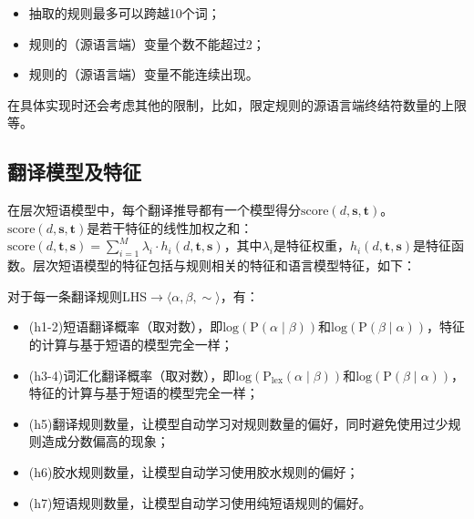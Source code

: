 \begin{itemize}
\vspace{0.5em}
\item 抽取的规则最多可以跨越10个词；
\vspace{0.5em}
\item 规则的（源语言端）变量个数不能超过2；
\vspace{0.5em}
\item 规则的（源语言端）变量不能连续出现。
\vspace{0.5em}
\end{itemize}
\parinterval 在具体实现时还会考虑其他的限制，比如，限定规则的源语言端终结符数量的上限等。


\subsection{翻译模型及特征}

\parinterval 在层次短语模型中，每个翻译推导都有一个模型得分$\textrm{score}(d,\mathbf{s},\mathbf{t})$。$\textrm{score}(d,\mathbf{s},\mathbf{t})$是若干特征的线性加权之和：$\textrm{score}(d,\mathbf{t},\mathbf{s})=\sum_{i=1}^M\lambda_i\cdot h_i (d,\mathbf{t},\mathbf{s})$，其中$\lambda_i$是特征权重，$h_i (d,\mathbf{t},\mathbf{s})$是特征函数。层次短语模型的特征包括与规则相关的特征和语言模型特征，如下：

\parinterval 对于每一条翻译规则LHS$\to \langle \alpha, \beta ,\sim \rangle$，有：

\begin{itemize}
\vspace{0.5em}
\item 	(h1-2)短语翻译概率（取对数），即$\textrm{log}(\textrm{P}(\alpha \mid \beta))$和$\textrm{log}(\textrm{P}(\beta \mid \alpha))$，特征的计算与基于短语的模型完全一样；
\vspace{0.5em}
\item 	(h3-4)词汇化翻译概率（取对数），即$\textrm{log}(\textrm{P}_{\textrm{lex}}(\alpha \mid \beta))$和$\textrm{log}(\textrm{P}(\beta \mid \alpha))$，特征的计算与基于短语的模型完全一样；
\vspace{0.5em}
\item (h5)翻译规则数量，让模型自动学习对规则数量的偏好，同时避免使用过少规则造成分数偏高的现象；
\vspace{0.5em}
\item (h6)胶水规则数量，让模型自动学习使用胶水规则的偏好；
\vspace{0.5em}
\item (h7)短语规则数量，让模型自动学习使用纯短语规则的偏好。
\vspace{0.5em}
\end{itemize}

